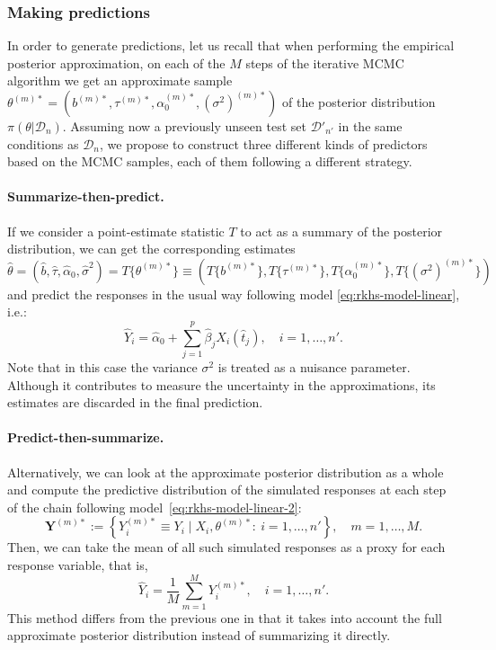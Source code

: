 \subsubsection{Making predictions}

In order to generate predictions, let us recall that when performing the empirical posterior approximation, on each of the \(M\) steps of the iterative MCMC algorithm we get an approximate sample \(\theta^{(m)*}=(b^{(m)*}, \tau^{(m)*}, \alpha_0^{(m)*}, (\sigma^2)^{(m)*})\) of the posterior distribution \(\pi(\theta| \mathcal D_n)\). Assuming now a previously unseen test set \(\mathcal D'_{n'}\) in the same conditions as \(\mathcal D_n\), we propose to construct three different kinds of predictors based on the MCMC samples, each of them following a different strategy.

  \paragraph{Summarize-then-predict.} If we consider a point-estimate statistic \(T\) to act as a summary of the posterior distribution, we can get the corresponding estimates \(\hat{\theta}=(\hat b, \hat \tau, \hat{\alpha}_0, \hat{\sigma}^2) = T\{\theta^{(m)*}\} \equiv (T\{b^{(m)*}\}, T\{\tau^{(m)*}\}, T\{\alpha_0^{(m)*}\}, T\{(\sigma^2)^{(m)*}\})\) and predict the responses in the usual way following model \eqref{eq:rkhs-model-linear}, i.e.:
  \[
    \hat Y_i = \hat{\alpha}_0 + \sum_{j=1}^p \hat{\beta}_j X_i(\hat{t}_j), \quad i=1,\dots, n'.
  \]
  Note that in this case the variance \(\sigma^2\) is treated as a nuisance parameter. Although it contributes to measure the uncertainty in the approximations, its estimates are discarded in the final prediction.

  \paragraph{Predict-then-summarize.} Alternatively, we can  look at the approximate posterior distribution as a whole and compute the predictive distribution of the simulated responses at each step of the chain following model~\eqref{eq:rkhs-model-linear-2}:
  \begin{equation}\label{eq:sampled-response-vector}
  \symbf Y^{(m)*} := \left\{Y_i^{(m)*} \equiv Y_i \mid X_i, \theta^{(m)*}:\ i=1,\dots,n'\right\}, \quad m=1,\dots,M.
  \end{equation}
  Then, we can take the mean of all such simulated responses as a proxy for each response variable, that is,
  \[
  \hat Y_i = \frac{1}{M}\sum_{m=1}^M Y_i^{(m)*}, \quad i=1,\dots,n'.
  \]
  This method differs from the previous one in that it takes into account the full approximate posterior distribution instead of summarizing it directly.

